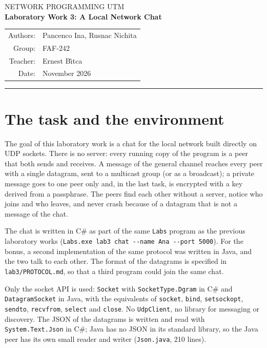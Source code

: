 \documentclass[11pt,a4paper]{article}
\newcommand{\code}[1]{{\frenchspacing\texttt{#1}}}
\begin{document}
\begin{center}
  {\small NETWORK PROGRAMMING \textperiodcentered{} UTM}\\[6pt]
  {\LARGE\bfseries Laboratory Work 3: A Local Network Chat}\\[10pt]
  \begin{tabular}{rl}
    Authors: & Pancenco Ina, Rusnac Nichita \\
    Group:   & FAF-242 \\
    Teacher: & Ernest B\^{\i}tca \\
    Date:    & November 2026
  \end{tabular}
\end{center}
\vspace{4pt}\hrule\vspace{8pt}

\section{The task and the environment}

The goal of this laboratory work is a chat for the local network built directly on UDP sockets.
There is no server: every running copy of the program is a peer that both sends and receives. A
message of the general channel reaches every peer with a single datagram, sent to a multicast group
(or as a broadcast); a private message goes to one peer only and, in the last task, is encrypted
with a key derived from a passphrase. The peers find each other without a server, notice who joins
and who leaves, and never crash because of a datagram that is not a message of the chat.

The chat is written in C\# as part of the same \code{Labs} program as the previous laboratory works
(\code{Labs.exe lab3 chat -{}-name Ana -{}-port 5000}). For the bonus, a second implementation of the
same protocol was written in Java, and the two talk to each other. The format of the datagrams is
specified in \code{lab3/PROTOCOL.md}, so that a third program could join the same chat.

Only the socket API is used: \code{Socket} with \code{SocketType.Dgram} in C\# and
\code{DatagramSocket} in Java, with the equivalents of \code{socket}, \code{bind},
\code{setsockopt}, \code{sendto}, \code{recvfrom}, \code{select} and \code{close}. No
\code{UdpClient}, no library for messaging or discovery. The JSON of the datagrams is written and
read with \code{System.Text.Json} in C\#; Java has no JSON in its standard library, so the Java peer
has its own small reader and writer (\code{Json.java}, 210 lines).
\end{document}

